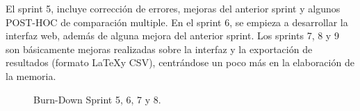 El sprint 5, incluye corrección de errores, mejoras del anterior sprint y algunos POST-HOC de comparación multiple. En el sprint 6, se empieza a desarrollar la interfaz web, además de alguna mejora del anterior sprint. Los sprints 7, 8 y 9 son básicamente mejoras realizadas sobre la interfaz y la exportación de resultados (formato \LaTeX \space y CSV), centrándose un poco más en la elaboración de la memoria.

\begin{figure}[h]
\centering
{}
\end{figure}
\begin{figure}[h]
\centering
{}
\caption{Burn-Down Sprint 5, 6, 7 y 8.}
\label{fig:bd2}
\end{figure}

